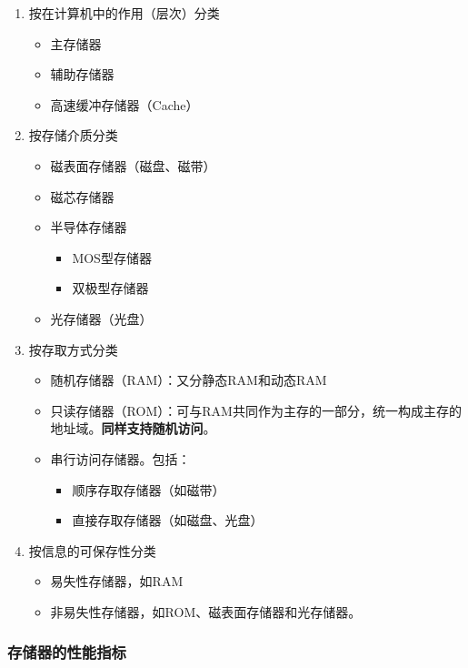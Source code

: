 \documentclass[12pt, a4paper, oneside]{ctexart}
\begin{document}
\begin{enumerate}
  \item {\kaishu 按在计算机中的作用（层次）分类}
  \begin{itemize}
    \item 主存储器
    \item 辅助存储器
    \item 高速缓冲存储器（Cache）
  \end{itemize}
  \item {\kaishu 按存储介质分类}
  \begin{itemize}
    \item 磁表面存储器（磁盘、磁带）
    \item 磁芯存储器
    \item 半导体存储器
    \begin{itemize}
      \item MOS型存储器
      \item 双极型存储器
    \end{itemize}
    \item 光存储器（光盘）
  \end{itemize}
  \item {\kaishu 按存取方式分类}
  \begin{itemize}
    \item 随机存储器（RAM）：又分静态RAM和动态RAM
    \item 只读存储器（ROM）：可与RAM共同作为主存的一部分，统一构成主存的地址域。\textbf{同样支持随机访问}。
    \item 串行访问存储器。包括：
    \begin{itemize}
      \item 顺序存取存储器（如磁带）
      \item 直接存取存储器（如磁盘、光盘）
    \end{itemize}
  \end{itemize}
  \item {\kaishu 按信息的可保存性分类}
  \begin{itemize}
    \item 易失性存储器，如RAM
    \item 非易失性存储器，如ROM、磁表面存储器和光存储器。
  \end{itemize}
\end{enumerate}

\subsubsection{存储器的性能指标}
\end{document}

